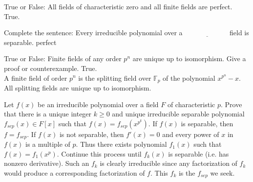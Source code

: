 \documentclass[avery5371,grid]{flashcards}
\newcommand{\F}{\mathbb{F}}
\newcommand{\blank}{$\; \underline{\hspace{1in}} \; $}
\begin{document}
\begin{flashcard}[Fields]{True or False: All fields of characteristic zero and all finite fields are perfect.}
 True.
\end{flashcard}

\begin{flashcard}[Fields]{Complete the sentence: Every irreducible polynomial over a \blank field is separable.}
 perfect
\end{flashcard}

\begin{flashcard}[Fields]{True or False: Finite fields of any order $p^n$ are unique up to isomorphism. Give a proof or counterexample.}
 True. \\
 
 A finite field of order $p^n$ is the splitting field over $\F_p$ of the polynomial $x^{p^n} - x$. All splitting fields are unique up to isomorphism.
\end{flashcard}

\begin{flashcard}[Fields]{Let $f(x)$ be an irreducible polynomial over a field $F$ of characteristic $p$. Prove that there is a unique integer $k \geq 0$ and unique irreducible separable polynomial $f_{sep}(x) \in F[x]$ such that $f(x) = f_{sep}\left (x^{p^k} \right )$.}
 If $f(x)$ is separable, then $f = f_{sep}$. If $f(x)$ is not separable, then $f'(x) = 0$ and every power of $x$ in $f(x)$ is a multiple of $p$. Thus there exists polynomial $f_1(x)$ such that $f(x) = f_1(x^p)$. Continue this process until $f_k(x)$ is separable (i.e. has nonzero derivative). Such an $f_k$ is clearly irreducible since any factorization of $f_k$ would produce a corresponding factorization of $f$. This $f_k$ is the $f_{sep}$ we seek.
\end{flashcard}
\end{document}
